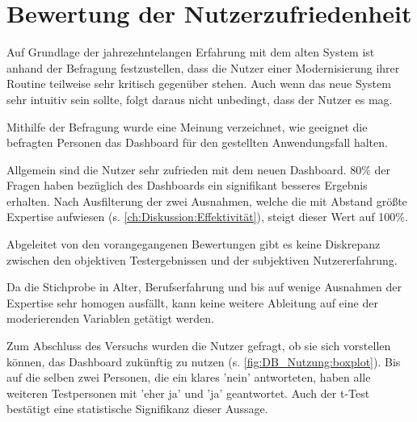 \section{Bewertung der Nutzerzufriedenheit}
\label{ch:Diskussion:Zufriedenheit}

Auf Grundlage der jahrezehntelangen Erfahrung mit dem alten System ist anhand der Befragung festzustellen, dass die Nutzer einer Modernisierung ihrer Routine teilweise sehr kritisch gegenüber stehen. Auch wenn das neue System sehr intuitiv sein sollte, folgt daraus nicht unbedingt, dass der Nutzer es mag.

Mithilfe der Befragung wurde eine Meinung verzeichnet, wie geeignet die befragten Personen das Dashboard für den gestellten Anwendungsfall halten.

Allgemein sind die Nutzer sehr zufrieden mit dem neuen Dashboard. 80\% der Fragen haben bezüglich des Dashboards ein signifikant besseres Ergebnis erhalten. Nach Ausfilterung der zwei Ausnahmen, welche die mit Abstand größte Expertise aufwiesen (s. \autoref{ch:Diskussion:Effektivität}), steigt dieser Wert auf 100\%.

Abgeleitet von den vorangegangenen Bewertungen gibt es keine Diskrepanz zwischen den objektiven Testergebnissen und der subjektiven Nutzererfahrung.

Da die Stichprobe in Alter, Berufserfahrung und bis auf wenige Ausnahmen der Expertise sehr homogen ausfällt, kann keine weitere Ableitung auf eine der moderierenden Variablen getätigt werden. 


Zum Abschluss des Versuchs wurden die Nutzer gefragt, ob sie sich vorstellen können, das Dashboard zukünftig zu nutzen (s. \autoref{fig:DB_Nutzung:boxplot}). Bis auf die selben zwei Personen, die ein klares 'nein' antworteten, haben alle weiteren Testpersonen mit 'eher ja' und 'ja' geantwortet. Auch der t-Test bestätigt eine statistische Signifikanz dieser Aussage.
